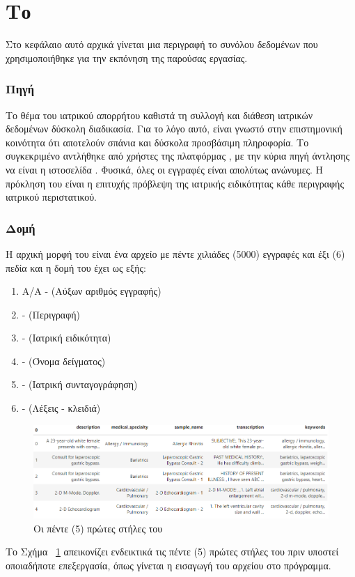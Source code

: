 \section{Το }
Στο κεφάλαιο αυτό αρχικά γίνεται μια περιγραφή το συνόλου δεδομένων   που χρησιμοποιήθηκε για την εκπόνηση της παρούσας εργασίας. 

\subsubsection{Πηγή }
Το θέμα του ιατρικού απορρήτου καθιστά τη συλλογή και διάθεση ιατρικών δεδομένων δύσκολη διαδικασία. Για το λόγο αυτό, είναι γνωστό στην επιστημονική κοινότητα ότι αποτελούν σπάνια και δύσκολα προσβάσιμη πληροφορία. Το συγκεκριμένο  αντλήθηκε από χρήστες της πλατφόρμας  \cite{dataset}, με την κύρια πηγή άντλησης να είναι η ιστοσελίδα . \cite{mtsamples}
Φυσικά, όλες οι εγγραφές είναι απολύτως ανώνυμες. Η πρόκληση του  είναι η επιτυχής πρόβλεψη της ιατρικής ειδικότητας κάθε περιγραφής ιατρικού περιστατικού.

\subsubsection{Δομή }
Η αρχική μορφή του  είναι ένα αρχείο  με πέντε χιλιάδες (5000) εγγραφές και έξι (6) πεδία και η δομή του έχει ως εξής:
\begin{enumerate}
    \item Α/Α - (Αύξων αριθμός εγγραφής)
    \item {} - (Περιγραφή)
    \item {} - (Ιατρική ειδικότητα)
    \item {} - (Όνομα δείγματος)
    \item {} - (Ιατρική συνταγογράφηση)
    \item {} - (Λέξεις - κλειδιά)
\end{enumerate}
\clearpage

\begin{figure} [ht!]
\includegraphics[width=\textwidth,height=\textheight,keepaspectratio]{pictures/3dataset5sthles.png} \caption{Οι πέντε (5) πρώτες στήλες του }\label{figure3.1}
\end{figure}
Το Σχήμα~ \ref{figure3.1} απεικονίζει ενδεικτικά τις πέντε (5) πρώτες στήλες του  πριν υποστεί οποιαδήποτε επεξεργασία, όπως γίνεται η εισαγωγή του αρχείου  στο πρόγραμμα.


